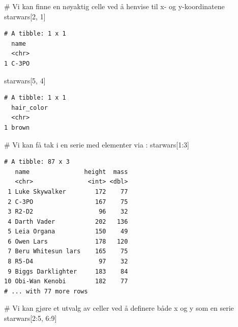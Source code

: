 \documentclass[
  letterpaper,
  DIV=11,
  numbers=noendperiod]{scrreprt}
\newenvironment{Shaded}{\begin{snugshade}}{\end{snugshade}}
\newcommand{\CommentTok}[1]{\textcolor[rgb]{0.37,0.37,0.37}{#1}}
\newcommand{\DecValTok}[1]{\textcolor[rgb]{0.68,0.00,0.00}{#1}}
\newcommand{\NormalTok}[1]{\textcolor[rgb]{0.00,0.23,0.31}{#1}}
\newcommand{\SpecialCharTok}[1]{\textcolor[rgb]{0.37,0.37,0.37}{#1}}
\begin{document}
\begin{Shaded}
\begin{Highlighting}[]
\CommentTok{\# Vi kan finne en nøyaktig celle ved å henvise til x{-} og y{-}koordinatene}
\NormalTok{starwars[}\DecValTok{2}\NormalTok{, }\DecValTok{1}\NormalTok{]}
\end{Highlighting}
\end{Shaded}

\begin{verbatim}
# A tibble: 1 x 1
  name 
  <chr>
1 C-3PO
\end{verbatim}

\begin{Shaded}
\begin{Highlighting}[]
\NormalTok{starwars[}\DecValTok{5}\NormalTok{, }\DecValTok{4}\NormalTok{]}
\end{Highlighting}
\end{Shaded}

\begin{verbatim}
# A tibble: 1 x 1
  hair_color
  <chr>     
1 brown     
\end{verbatim}

\begin{Shaded}
\begin{Highlighting}[]
\CommentTok{\# Vi kan få tak i en serie med elementer via \textasciigrave{}:\textasciigrave{}}
\NormalTok{starwars[}\DecValTok{1}\SpecialCharTok{:}\DecValTok{3}\NormalTok{]}
\end{Highlighting}
\end{Shaded}

\begin{verbatim}
# A tibble: 87 x 3
   name               height  mass
   <chr>               <int> <dbl>
 1 Luke Skywalker        172    77
 2 C-3PO                 167    75
 3 R2-D2                  96    32
 4 Darth Vader           202   136
 5 Leia Organa           150    49
 6 Owen Lars             178   120
 7 Beru Whitesun lars    165    75
 8 R5-D4                  97    32
 9 Biggs Darklighter     183    84
10 Obi-Wan Kenobi        182    77
# ... with 77 more rows
\end{verbatim}

\begin{Shaded}
\begin{Highlighting}[]
\CommentTok{\# Vi kan gjøre et utvalg av celler ved å definere både x og y som en serie}
\NormalTok{starwars[}\DecValTok{2}\SpecialCharTok{:}\DecValTok{5}\NormalTok{, }\DecValTok{6}\SpecialCharTok{:}\DecValTok{9}\NormalTok{]}
\end{Highlighting}
\end{Shaded}
\end{document}
